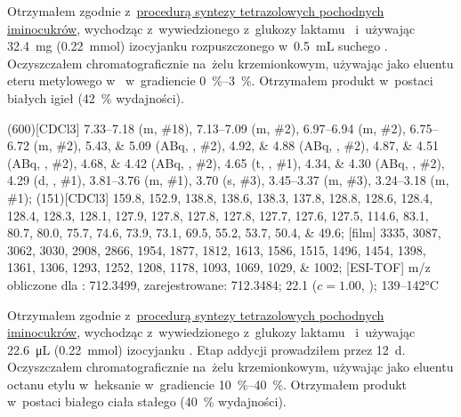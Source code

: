 Otrzymałem zgodnie z~\hyperref[experimental:sugars:schwartz]{procedurą syntezy tetrazolowych
  pochodnych iminocukrów}, wychodząc z~wywiedzionego z~glukozy laktamu~
  i~używając \SI{32.4}{\milli\gram} (\SI{0.22}{\milli\mol}) izocyjanku 
  rozpuszczonego w~\SI{0.5}{\milli\liter} suchego .
Oczyszczałem chromatograficznie na~żelu krzemionkowym,
  używając jako eluentu eteru  metylowego w~ w~gradiencie
  \SIrange{0}{3}{\percent}.
Otrzymałem produkt w~postaci białych igieł (\SI{42}{\percent} wydajności).

\begin{fullexp}
  \NMR(600)[CDCl3] \numrange{7.33}{7.18} (m, \#{18}), \numrange{7.13}{7.09} (m, \#{2}), \numrange{6.97}{6.94} (m, \#{2}), \numrange{6.75}{6.72} (m, \#{2}), \numlist{5.43;5.09} (ABq, , \#{2}), \numlist{4.92;4.88} (ABq, , \#{2}), \numlist{4.87;4.51} (ABq, , \#{2}), \numlist{4.68;4.42} (ABq, , \#{2}), \num{4.65} (t, , \#{1}), \numlist{4.34;4.30} (ABq, , \#{2}), \num{4.29} (d, , \#{1}), \numrange{3.81}{3.76} (m, \#{1}), \num{3.70} (s, \#{3}), \numrange{3.45}{3.37} (m, \#{3}), \numrange{3.24}{3.18} (m, \#{1});
  (151)[CDCl3] \numlist{159.8; 152.9; 138.8; 138.6; 138.3; 137.8; 128.8; 128.6; 128.4; 128.4; 128.3; 128.1; 127.9; 127.8; 127.8; 127.8; 127.7; 127.6; 127.5; 114.6; 83.1; 80.7; 80.0; 75.7; 74.6; 73.9; 73.1; 69.5; 55.2; 53.7; 50.4; 49.6};
  [film] \numlist{3335; 3087; 3062; 3030; 2908; 2866; 1954; 1877; 1812; 1613; 1586; 1515; 1496; 1454; 1398; 1361; 1306; 1293; 1252; 1208; 1178; 1093; 1069; 1029; 1002};
  [ESI-TOF] m/z obliczone dla : \num{712.3499}, zarejestrowane: \num{712.3484};
  \data{[$\alpha^{23}_D$]~$=$} \num{22.1} ($c = 1.00$, );
   \numrange{139}{142}\si{\celsius}
\end{fullexp}

Otrzymałem zgodnie z~\hyperref[experimental:sugars:schwartz]{procedurą syntezy tetrazolowych
  pochodnych iminocukrów}, wychodząc z~wywiedzionego z~glukozy laktamu~
  i~używając \SI{22.6}{\micro\liter} (\SI{0.22}{\milli\mol}) izocyjanku .
Etap addycji prowadziłem przez \SI{12}{\day}.
Oczyszczałem chromatograficznie na~żelu krzemionkowym,
  używając jako eluentu octanu etylu w~heksanie w~gradiencie \SIrange{10}{40}{\percent}.
Otrzymałem produkt w~postaci białego ciała stałego (\SI{40}{\percent} wydajności).

